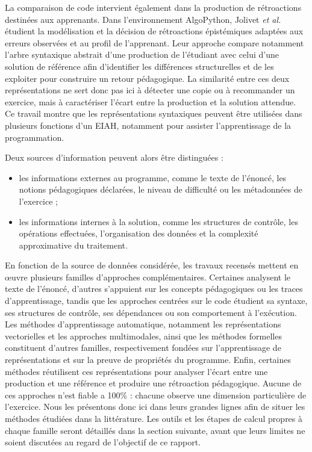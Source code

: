 \documentclass[12pt,a4paper,oneside]{report}
\begin{document}
La comparaison de code intervient également dans la production de
rétroactions destinées aux apprenants. Dans l'environnement AlgoPython,
Jolivet \emph{et al.} \cite{jolivet_modelisation_2025} étudient la
modélisation et la décision de rétroactions épistémiques adaptées aux erreurs
observées et au profil de l'apprenant. Leur approche compare notamment l'arbre
syntaxique abstrait d'une production de l'étudiant avec celui d'une solution
de référence afin d'identifier les différences structurelles et de les
exploiter pour construire un retour pédagogique. La similarité entre ces
deux représentations ne sert donc pas ici à détecter une copie ou à
recommander un exercice, mais à caractériser l'écart entre la production et
la solution attendue. Ce travail montre que les représentations syntaxiques
peuvent être utilisées dans plusieurs fonctions d'un EIAH, notamment pour
assister l'apprentissage de la programmation.

Deux sources d'information peuvent alors être distinguées :

\begin{itemize}
    \item les informations externes au programme, comme le texte de
    l'énoncé, les notions pédagogiques déclarées, le niveau de difficulté ou
    les métadonnées de l'exercice ;
    \item les informations internes à la solution, comme les structures de
    contrôle, les opérations effectuées, l'organisation des données et la
    complexité approximative du traitement.
\end{itemize}

\vspace{12pt}


En fonction de la source de données considérée, les travaux recensés mettent
en œuvre plusieurs familles d'approches complémentaires. Certaines analysent
le texte de l'énoncé, d'autres s'appuient sur les concepts pédagogiques ou
les traces d'apprentissage, tandis que les approches centrées sur le code
étudient sa syntaxe, ses structures de contrôle, ses dépendances ou son
comportement à l'exécution. Les méthodes d'apprentissage automatique,
notamment les représentations vectorielles et les approches multimodales,
ainsi que les méthodes formelles constituent d'autres familles,
respectivement fondées sur l'apprentissage de représentations et sur la
preuve de propriétés du programme. Enfin, certaines méthodes réutilisent
ces représentations pour analyser l'écart entre une production et une
référence et produire une rétroaction pédagogique. Aucune de ces approches
n'est fiable a 100\% : chacune observe une
dimension particulière de l'exercice. Nous les présentons donc ici dans
leurs grandes lignes afin de situer les méthodes étudiées dans la littérature.
Les outils et les étapes de calcul propres à chaque famille seront détaillés
dans la section suivante, avant que leurs limites ne soient discutées au
regard de l'objectif de ce rapport.
\end{document}
